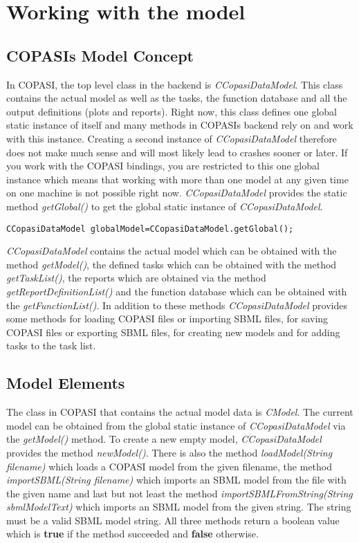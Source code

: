 \documentclass[a4,10pt]{article}
\begin{document}
\section{Working with the model}
\subsection{COPASIs Model Concept}
In COPASI, the top level class in the backend is \textit{CCopasiDataModel}. This class contains the actual model as well as the tasks, the function database and all the output definitions (plots and reports). Right now, this class defines one global static instance of itself and many methods in COPASIs backend rely on and work with this instance. Creating a second instance  of \textit{CCopasiDataModel} therefore does not make much sense and will most likely lead to crashes sooner or later. If you work with the COPASI bindings, you are restricted to this one global instance which means that working with more than one model at any given time on one machine is not possible right now.
\textit{CCopasiDataModel} provides the static method \textit{getGlobal()} to get the global static instance of \textit{CCopasiDataModel}.

\begin{lstlisting}
CCopasiDataModel globalModel=CCopasiDataModel.getGlobal();
\end{lstlisting}

\textit{CCopasiDataModel} contains the actual model which can be obtained with the method \textit{getModel()}, the defined tasks which can be obtained with the method \textit{getTaskList()}, the reports which are obtained via the method \textit{getReportDefinitionList()} and the function database which can be obtained with the \textit{getFunctionList()}.
In addition to these methods \textit{CCopasiDataModel} provides some methods for loading COPASI files or importing SBML files, for saving COPASI files or exporting SBML files, for creating new models and for adding tasks to the task list.

\subsection{Model Elements}
The class in COPASI that contains the actual model data is \textit{CModel}. The current model can be obtained from the global static instance of \textit{CCopasiDataModel} via the \textit{getModel()} method. To create a new empty model, \textit{CCopasiDataModel} provides the method \textit{newModel()}. There is also the method \textit{loadModel(String filename)} which loads a COPASI model from the given filename, the method \textit{importSBML(String filename)} which imports an SBML model from the file with the given name and last but not least the method \textit{importSBMLFromString(String sbmlModelText)} which imports an SBML model from the given string. The string must be a valid SBML model string. All three methods return a boolean value which is \textbf{true} if the method succeeded and \textbf{false} otherwise.
\end{document}
